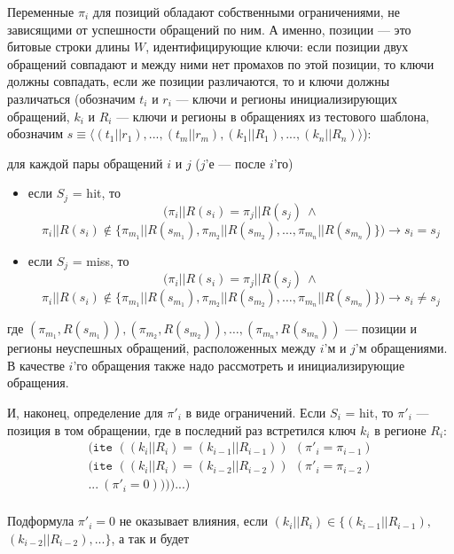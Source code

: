 Переменные $\pi_i$ для позиций обладают собственными ограничениями, не зависящими от успешности обращений по ним. А именно, позиции --- это битовые строки длины $W$, идентифицирующие ключи: если позиции двух обращений совпадают и между ними нет промахов по этой позиции, то ключи должны совпадать, если же позиции различаются, то и ключи должны различаться (обозначим $t_i$ и $r_i$ --- ключи и регионы инициализирующих обращений, $k_i$ и $R_i$ --- ключи и регионы в обращениях из тестового шаблона, обозначим $s \equiv \langle (t_1||r_1), ..., (t_m||r_m), (k_1||R_1), ..., (k_n||R_n)\rangle$):

для каждой пары обращений $i$ и $j$ ($j$'е --- после $i$'го)
\begin{itemize}
    \item если $S_j$ = hit, то $$(\pi_i||R(s_i) = \pi_j||R(s_j)~\wedge$$ $$\pi_i||R(s_i) \notin \{\pi_{m_1}||R(s_{m_1}), \pi_{m_2}||R(s_{m_2}), \dots, \pi_{m_n}||R(s_{m_n})\}) \rightarrow s_i = s_j$$
    \item если $S_j$ = miss, то $$(\pi_i||R(s_i) = \pi_j||R(s_j)~\wedge$$ $$\pi_i||R(s_i) \notin \{\pi_{m_1}||R(s_{m_1}), \pi_{m_2}||R(s_{m_2}), \dots, \pi_{m_n}||R(s_{m_n})\}) \rightarrow s_i \neq s_j$$
\end{itemize}
где $(\pi_{m_1},R(s_{m_1})), (\pi_{m_2},R(s_{m_2})), \dots, (\pi_{m_n},R(s_{m_n}))$ --- позиции и регионы неуспешных обращений,
расположенных между $i$'м и $j$'м обращениями. В качестве $i$'го обращения также надо рассмотреть и инициализирующие обращения.


И, наконец, определение для $\pi'_i$ в виде ограничений. Если $S_i$ = hit, то  $\pi'_i$ --- позиция в том обращении, где в последний раз встретился ключ $k_i$ в регионе $R_i$:
$$
\begin{array}{l}
\texttt{(ite~} ((k_i||R_i) = (k_{i-1}||R_{i-1})) ~~ (\pi'_i = \pi_{i-1})\\
\texttt{(ite~} ((k_i||R_i) = (k_{i-2}||R_{i-2})) ~~ (\pi'_i = \pi_{i-2})\\
... ~(\pi'_i = 0)\texttt{)))...)}\\
\end{array}
$$

Подформула $\pi'_i = 0$ не оказывает влияния, если $(k_i||R_i) \in \{(k_{i-1}||R_{i-1}),$ $(k_{i-2}||R_{i-2}), ... \}$, а так и будет

